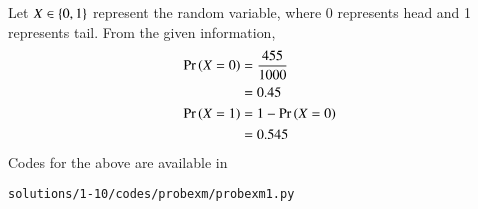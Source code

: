 Let $X\in\left\{0,1\right\}$ represent the random variable, where $0$ represents head and 1 represents tail.  From the given information,
\begin{align}
\Pr\left(X=0\right) &= \frac{455}{1000}
\\
&= 0.45
\\
\Pr\left(X=1\right) &= 1-\Pr\left(X=0\right)
\\
&= 0.545
\end{align}
Codes for the above are available in
\begin{lstlisting}
solutions/1-10/codes/probexm/probexm1.py
\end{lstlisting}
